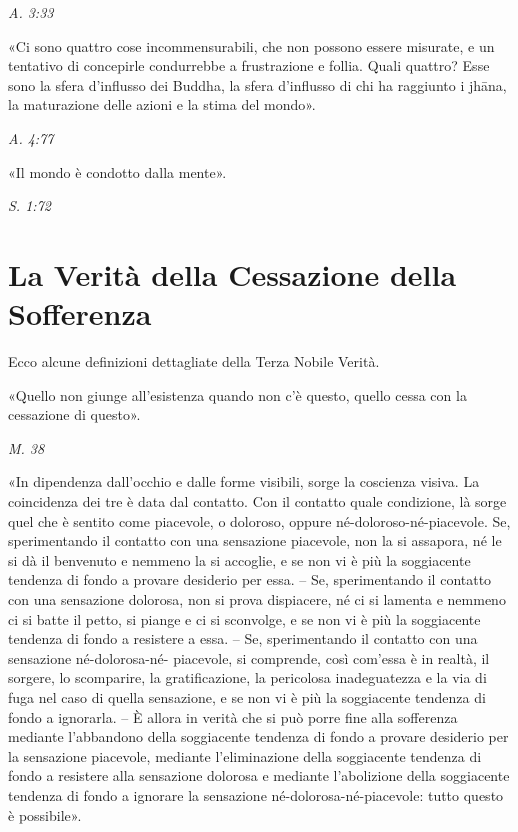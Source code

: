 \emph{A. 3:33}


«Ci sono quattro cose incommensurabili, che non possono essere misurate,
e un tentativo di concepirle condurrebbe a frustrazione e follia. Quali
quattro? Esse sono la sfera d’influsso dei Buddha, la sfera d’influsso
di chi ha raggiunto i jhāna, la maturazione delle azioni e la stima del
mondo».


\emph{A. 4:77}


«Il mondo è condotto dalla mente».


\emph{S. 1:72}


\hypertarget{x-la-verità-della-cessazione-della-sofferenza}{\section*{La Verità della Cessazione della Sofferenza}}
 Ecco alcune definizioni dettagliate della Terza
Nobile Verità.


 «Quello non giunge all’esistenza quando non c’è questo,
quello cessa con la cessazione di questo».


\emph{M. 38}


«In dipendenza dall’occhio e dalle forme visibili, sorge la coscienza
visiva. La coincidenza dei tre è data dal contatto. Con il contatto
quale condizione, là sorge quel che è sentito come piacevole, o
doloroso, oppure né-doloroso-né-piacevole. Se, sperimentando il contatto
con una sensazione piacevole, non la si assapora, né le si dà il
benvenuto e nemmeno la si accoglie, e se non vi è più la soggiacente
tendenza di fondo a provare desiderio per essa. – Se, sperimentando il
contatto con una sensazione dolorosa, non si prova dispiacere, né ci si
lamenta e nemmeno ci si batte il petto, si piange e ci si sconvolge, e
se non vi è più la soggiacente tendenza di fondo a resistere a essa. –
Se, sperimentando il contatto con una sensazione né-dolorosa-né-
piacevole, si comprende, così com’essa è in realtà, il sorgere, lo
scomparire, la gratificazione, la pericolosa inadeguatezza e la via di
fuga nel caso di quella sensazione, e se non vi è più la soggiacente
tendenza di fondo a ignorarla. – È allora in verità che si può porre
fine alla sofferenza mediante l’abbandono della soggiacente tendenza di
fondo a provare desiderio per la sensazione piacevole, mediante
l’eliminazione della soggiacente tendenza di fondo a resistere alla
sensazione dolorosa e mediante l’abolizione della soggiacente tendenza
di fondo a ignorare la sensazione né-dolorosa-né-piacevole: tutto questo
è possibile».


